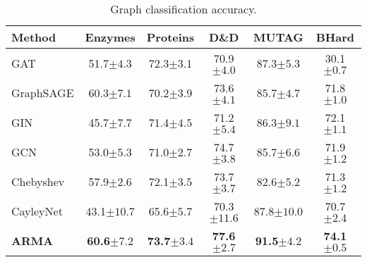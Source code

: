 \documentclass{article}
\begin{document}
\begin{table}
\caption{Graph classification accuracy.}
\setlength\tabcolsep{.2em} \small
\centering
\bgroup
\def\arraystretch{1.0} \begin{tabular}{lccccc}
\cmidrule[1.5pt]{1-6}
\textbf{Method} & \textbf{Enzymes} & \textbf{Proteins} & \textbf{D\&D} & \textbf{MUTAG} & \textbf{BHard} \\
\midrule
GAT             & 51.7\tiny{$\pm 4.3$}  & 72.3\tiny{$\pm 3.1$} & 70.9\tiny{$\pm 4.0$}  & 87.3\tiny{$\pm 5.3$}  & 30.1\tiny{$\pm0.7$} \\
GraphSAGE       & 60.3\tiny{$\pm 7.1$}  & 70.2\tiny{$\pm 3.9$} & 73.6\tiny{$\pm 4.1$}  & 85.7\tiny{$\pm 4.7$}  & 71.8\tiny{$\pm1.0$} \\
GIN             & 45.7\tiny{$\pm 7.7$}  & 71.4\tiny{$\pm 4.5$} & 71.2\tiny{$\pm 5.4$}  & 86.3\tiny{$\pm 9.1$}  & 72.1\tiny{$\pm1.1$} \\
\midrule
GCN             & 53.0\tiny{$\pm 5.3$}  & 71.0\tiny{$\pm 2.7$} & 74.7\tiny{$\pm 3.8$}  & 85.7\tiny{$\pm 6.6$}  & 71.9\tiny{$\pm1.2$} \\
Chebyshev       & 57.9\tiny{$\pm 2.6$}  & 72.1\tiny{$\pm 3.5$} & 73.7\tiny{$\pm 3.7$}  & 82.6\tiny{$\pm 5.2$}  & 71.3\tiny{$\pm1.2$} \\
CayleyNet       & 43.1\tiny{$\pm 10.7$} & 65.6\tiny{$\pm 5.7$} & 70.3\tiny{$\pm 11.6$} & 87.8\tiny{$\pm 10.0$} & 70.7\tiny{$\pm2.4$} \\
\textbf{ARMA}   & \textbf{60.6\tiny{$\pm 7.2$}}  & \textbf{73.7\tiny{$\pm 3.4$}} & \textbf{77.6\tiny{$\pm 2.7$}}  & \textbf{91.5\tiny{$\pm 4.2$}}  & \textbf{74.1\tiny{$\pm0.5$}} \\
\cmidrule[1.5pt]{1-6}
\end{tabular}
\egroup
\label{tab:gc_res}
\end{table}
\end{document}
